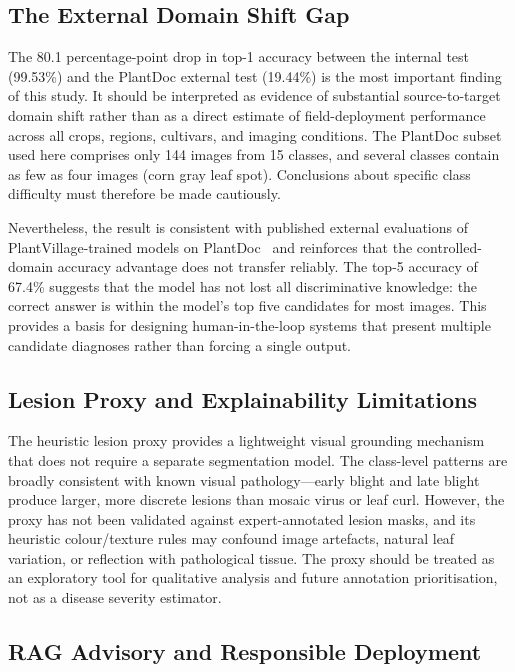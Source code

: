 \documentclass[conference]{IEEEtran}
\begin{document}
\subsection{The External Domain Shift Gap}

The 80.1 percentage-point drop in top-1 accuracy between the internal test
(99.53\%) and the PlantDoc external test (19.44\%) is the most important finding
of this study. It should be interpreted as evidence of substantial source-to-target
domain shift rather than as a direct estimate of field-deployment performance
across all crops, regions, cultivars, and imaging conditions. The PlantDoc subset
used here comprises only 144 images from 15 classes, and several classes contain
as few as four images (corn gray leaf spot). Conclusions about specific class
difficulty must therefore be made cautiously.

Nevertheless, the result is consistent with published external evaluations of
PlantVillage-trained models on PlantDoc~\cite{singh2020plantdoc,chen2020using}
and reinforces that the controlled-domain accuracy advantage does not transfer
reliably. The top-5 accuracy of 67.4\% suggests that the model has not lost all
discriminative knowledge: the correct answer is within the model's top five
candidates for most images. This provides a basis for designing human-in-the-loop
systems that present multiple candidate diagnoses rather than forcing a single
output.

\subsection{Lesion Proxy and Explainability Limitations}

The heuristic lesion proxy provides a lightweight visual grounding mechanism
that does not require a separate segmentation model. The class-level patterns
are broadly consistent with known visual pathology---early blight and late blight
produce larger, more discrete lesions than mosaic virus or leaf curl. However,
the proxy has not been validated against expert-annotated lesion masks, and its
heuristic colour/texture rules may confound image artefacts, natural leaf
variation, or reflection with pathological tissue. The proxy should be treated
as an exploratory tool for qualitative analysis and future annotation
prioritisation, not as a disease severity estimator.

\subsection{RAG Advisory and Responsible Deployment}
\end{document}
